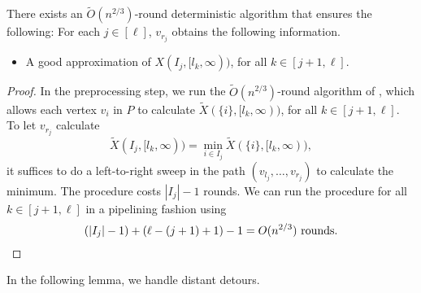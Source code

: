 \begin{lemma}
\label{lem:far1}
There exists an $\widetilde{O}(n^{2/3})$-round deterministic algorithm that ensures the following: For each $j \in [\ell]$, $v_{r_j}$ obtains the following information.
\begin{itemize}
    \item A good approximation of $X(I_j, [l_k, \infty))$, for all $k \in [j+1, \ell]$.
\end{itemize}
\end{lemma}
\begin{proof}
In the preprocessing step, we run the $\widetilde{O}(n^{2/3})$-round algorithm of , which allows each vertex $v_i$ in $P$ to calculate $\widetilde{X}(\{i\}, [l_k, \infty))$, for all $k \in [j+1, \ell]$. To let  $v_{r_j}$ calculate \[\widetilde{X}(I_j, [l_k, \infty)) = \min_{i \in I_j} \widetilde{X}(\{i\}, [l_k, \infty)),\] it suffices to do a left-to-right sweep in the path $(v_{l_j}, \ldots, v_{r_j})$ to calculate the minimum. The procedure costs $|I_j|-1$ rounds.  We can run the procedure for all $k \in [j+1, \ell]$ in a pipelining fashion using \[(|I_j|-1) + (\ell-(j+1)+1) - 1 = O(n^{2/3}) \text{ rounds.} \qedhere\]

\end{proof}

In the following lemma, we handle distant detours.

